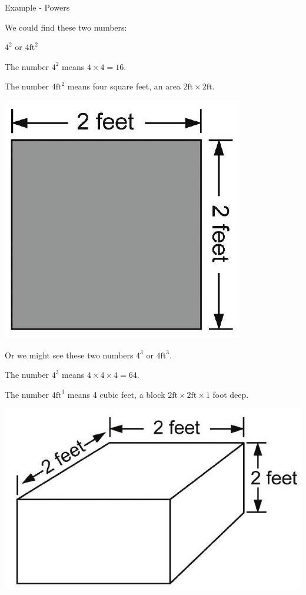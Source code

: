 \documentclass[10pt]{article}
\begin{document}
Example - Powers

We could find these two numbers:

$4^{2}$ or $4 \mathrm{ft}^{2}$

The number $4^{2}$ means $4 \times 4=16$.

The number $4 \mathrm{ft}^{2}$ means four square feet, an area $2 \mathrm{ft} \times 2 \mathrm{ft}$.

\includegraphics[max width=\textwidth]{2022_09_11_72dbedc910e6e984560cg-15}

Or we might see these two numbers $4^{3}$ or $4 \mathrm{ft}^{3}$.

The number $4^{3}$ means $4 \times 4 \times 4=64$.

The number $4 \mathrm{ft}^{3}$ means 4 cubic feet, a block $2 \mathrm{ft} \times 2 \mathrm{ft} \times 1$ foot deep.

\includegraphics[max width=\textwidth]{2022_09_11_72dbedc910e6e984560cg-15(1)}
\end{document}
